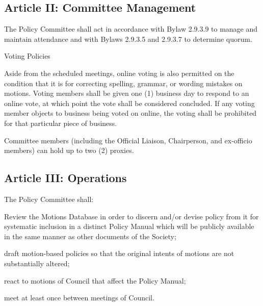 \subsection{Article II: Committee Management}
\begin{longenum}[ label*=\thesubsection.\arabic*., align=left] 	
\item The Policy Committee shall act in accordance with Bylaw 2.9.3.9 to manage and maintain
attendance and with Bylaws 2.9.3.5 and 2.9.3.7 to determine quorum.
\item Voting Policies
	\begin{longenum}[label*=\arabic*., align=left]	
	\item Aside from the scheduled meetings, online voting is also permitted on the condition that it is for correcting spelling, grammar, or wording mistakes on motions. Voting members shall be given one (1) business day to respond to an online vote, at which point the vote shall be considered concluded. If any voting member objects to business being voted on online, the voting shall be prohibited for that particular piece of business.
	\item Committee members (including the Official Liaison, Chairperson, and ex-officio members) can hold up to two (2) proxies.
	\end{longenum}
\end{longenum}

\subsection{Article III: Operations}
\begin{longenum}[ label*=\thesubsection.\arabic*., align=left] 
\item The Policy Committee shall:
	\begin{longenum}[label*=\arabic*., align=left]
	\item Review the Motions Database in order to discern and/or devise policy from it for systematic inclusion in a distinct Policy Manual which will be publicly available in the same manner as other documents of the Society;
	\item draft motion-based policies so that the original intents of motions are not substantially altered;
	\item react to motions of Council that affect the Policy Manual;
	\item meet at least once between meetings of Council.
	\end{longenum}
\end{longenum}














